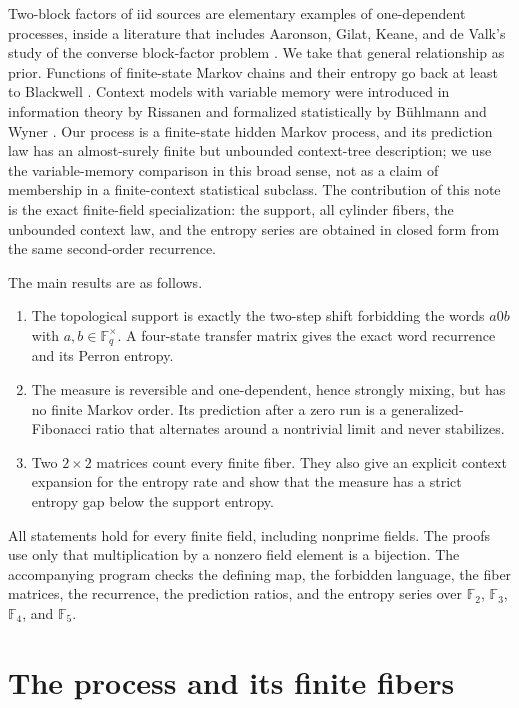 \documentclass[11pt,a4paper]{amsart}
\theoremstyle{definition}
\theoremstyle{remark}
\newcommand{\F}{\mathbb F}
\begin{document}
Two-block factors of iid sources are elementary examples of one-dependent
processes, inside a literature that includes Aaronson, Gilat, Keane, and de
Valk's study of the converse block-factor problem \cite{AaronsonEtAl1989}.
We take that general relationship as prior.  Functions of finite-state Markov
chains and their entropy go back at least to Blackwell \cite{Blackwell1957}.
Context models with variable memory were
introduced in information theory by Rissanen \cite{Rissanen1983} and
formalized statistically by B\"uhlmann and Wyner
\cite{BuhlmannWyner1999}.  Our process is a finite-state hidden Markov process,
and its prediction law has an almost-surely finite but unbounded context-tree
description; we use the variable-memory comparison in this broad sense, not
as a claim of membership in a finite-context statistical subclass.  The
contribution of this note is the exact finite-field specialization:
the support, all cylinder fibers, the unbounded context law, and the entropy
series are obtained in closed form from the same second-order recurrence.

The main results are as follows.
\begin{enumerate}
\item The topological support is exactly the two-step shift forbidding the
      words $a0b$ with $a,b\in\F_q^\times$.  A four-state transfer matrix
      gives the exact word recurrence and its Perron entropy.
\item The measure is reversible and one-dependent, hence strongly mixing,
      but has no finite Markov order.  Its prediction after a zero run is a
      generalized-Fibonacci ratio that alternates around a nontrivial
      limit and never stabilizes.
\item Two $2\times2$ matrices count every finite fiber.  They also give an
      explicit context expansion for the entropy rate and show that the
      measure has a strict entropy gap below the support entropy.
\end{enumerate}

All statements hold for every finite field, including nonprime fields.  The
proofs use only that multiplication by a nonzero field element is a
bijection.  The accompanying program checks the defining map, the forbidden
language, the fiber matrices, the recurrence, the prediction ratios, and the
entropy series over $\F_2$, $\F_3$, $\F_4$, and $\F_5$.

\section{The process and its finite fibers}
\label{sec:setup}
\end{document}
